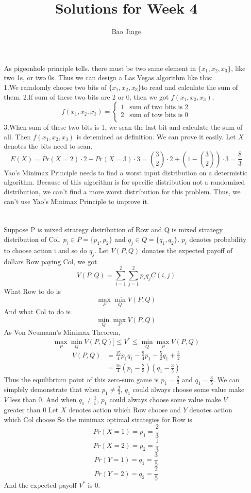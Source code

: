 \documentclass{article}
\author{Bao Jinge}
\title{Solutions for Week 4}
\date{}
\begin{document}
	\maketitle
	\section{}
	As pigeonhole principle tells. there must be two same element in $\{x_1, x_2, x_3\}$, like two 1s, or two 0s.
	Thus we can design a Las Vegas algorithm like this:\\
	1.We ramdomly choose two bits of $\{x_1,x_2,x_3\}$to read and calculate the sum of them.
	2.If sum of these two bits are 2 or 0, then we got $f(x_1,x_2,x_3)$.
		$$f(x_1,x_2,x_3)=
		\begin{cases}
		1& \text{sum of two bits is 2}\\
		2& \text{sum of tow bits is 0}\\
		\end{cases}$$
	3.When sum of these two bits is 1, we scan the last bit and calculate the sum of all. Then $f(x_1,x_2,x_3)$ is detemined as definition.
	We can prove it easily. Let $X$ denotes the bits need to scan.
	$$E(X)=Pr(X=2) \cdot 2 + Pr(X=3) \cdot 3
			=\binom{3}{2} \cdot 2 + (1-\binom{3}{2}) \cdot 3
			=\frac{8}{3}$$
	Yao's Minimax Principle needs to find a worst input distribution on a determistic algorithm. Because of this algorithm is for specific distribution not a randomized distribution, we can't find a more worst distribution for this problem. Thus, we can't use Yao's Minimax Principle to improve it.

	\section{}
	Suppose P is mixed strategy distribution of Row and Q is mixed strategy distribution of Col.
	$p_i \in P=\{p_1, p_2\}$ and $q_j \in Q=\{q_1, q_2\}$. $p_i$ denotes probability to choose action i and so do $q_j$.
	Let $V(P,Q)$ donates the expected payoff of dollars Row paying Col, we got
	$$V(P,Q) = \sum_{i=1}^{2}\sum_{j=1}^{2}p_iq_jC(i,j)$$
	What Row to do is 
	$$\max_{P}\min_{Q}V(P,Q)$$
	And what Col to do is
	$$\min_{Q}\max_{P}V(P,Q)$$
	As Von Neumann's Minimax Theorem,
	$$\max_{P}\min_{Q}V(P,Q)]\leq V^{*} \leq \min_{Q}\max_{P}V(P,Q)$$
	\begin{equation}
	\begin{aligned}
	V(P,Q)&=\frac{15}{4}p_1q_1-\frac{9}{4}p_1-\frac{5}{2}q_1+\frac{3}{2}\\
	&=\frac{15}{4}(p_1-\frac{2}{3})(q_1-\frac{3}{5})
	\end{aligned}
	\end{equation}
	Thus the equilibrium point of this zero-sum game is $p_1=\frac{2}{3}$ and $q_1=\frac{3}{5}$.
	We can simplely demonstrate that when $p_1 \neq \frac{2}{3}$, $q_1$ could always choose some value make $V$ less than $0$. And when $q_1 \neq \frac{3}{5}$, $p_1$ could always choose some value make $V$ greater than $0$
	Let $X$ denotes action which Row choose and $Y$ denotes action which Col choose
	So the minimax optimal strategies for Row is 
	$$Pr(X=1)=p_1=\frac{2}{3}$$
	$$Pr(X=2)=p_2=\frac{1}{3}$$
	$$Pr(Y=1)=q_1=\frac{3}{5}$$
	$$Pr(Y=2)=q_2=\frac{2}{5}$$
	And the expected payoff $V^{*}$ is $0$.
	    
\end{document}
